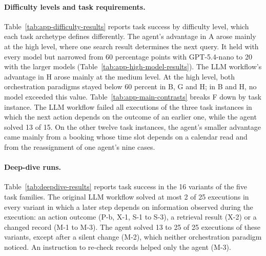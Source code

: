 \paragraph{Difficulty levels and task requirements.}
Table~\ref{tab:app-difficulty-results} reports task success by difficulty level, which each task archetype defines differently. The agent's advantage in A arose mainly at the high level, where one search result determines the next query. It held with every model but narrowed from 60 percentage points with GPT-5.4-nano to 20 with the larger models (Table~\ref{tab:app-high-model-results}). The LLM workflow's advantage in H arose mainly at the medium level. At the high level, both orchestration paradigms stayed below 60 percent in B, G and H; in B and H, no model exceeded this value. Table~\ref{tab:app-main-contrasts} breaks F down by task instance. The LLM workflow failed all executions of the three task instances in which the next action depends on the outcome of an earlier one, while the agent solved 13 of 15. On the other twelve task instances, the agent's smaller advantage came mainly from a booking whose time slot depends on a calendar read and from the reassignment of one agent's nine cases.

\paragraph{Deep-dive runs.}
Table~\ref{tab:deepdive-results} reports task success in the 16 variants of the five task families. The original LLM workflow solved at most 2 of 25 executions in every variant in which a later step depends on information observed during the execution: an action outcome (P-b, X-1, S-1 to S-3), a retrieval result (X-2) or a changed record (M-1 to M-3). The agent solved 13 to 25 of 25 executions of these variants, except after a silent change (M-2), which neither orchestration paradigm noticed. An instruction to re-check records helped only the agent (M-3).

